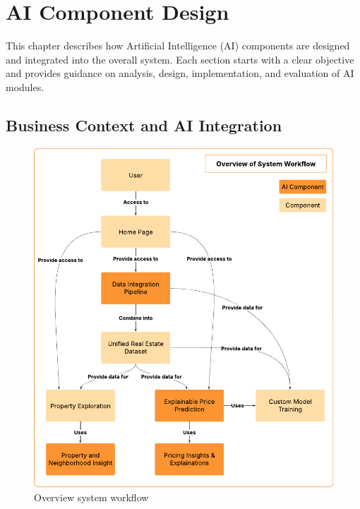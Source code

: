\chapter{AI Component Design}

This chapter describes how Artificial Intelligence (AI) components are designed and
integrated into the overall system. Each section starts with a clear objective and provides
guidance on analysis, design, implementation, and evaluation of AI modules.

\section{Business Context and AI Integration}

\begin{figure}[htbp]
	\centering
	\includegraphics[width=1\textwidth]{assets/system-workflow.png}
	\caption{Overview system workflow}
	\label{fig:system-workflow}
\end{figure}

